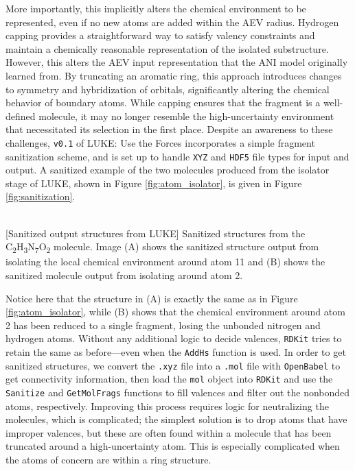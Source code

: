 More importantly, this implicitly alters the chemical environment to be represented, even if no new atoms are added within the AEV radius.
Hydrogen capping provides a straightforward way to satisfy valency constraints and maintain a chemically reasonable representation of the isolated substructure. 
However, this alters the AEV input representation that the ANI model originally learned from.
By truncating an aromatic ring, this approach introduces changes to symmetry and hybridization of orbitals, significantly altering the chemical behavior of boundary atoms.
While capping ensures that the fragment is a well-defined molecule, it may no longer resemble the high-uncertainty environment that necessitated its selection in the first place. 
Despite an awareness to these challenges, \verb|v0.1| of LUKE: Use the Forces incorporates a simple fragment sanitization scheme, and is set up to handle \verb|XYZ| and \verb|HDF5| file types for input and output. 
A sanitized example of the two molecules produced from the isolator stage of LUKE, shown in Figure \ref{fig:atom_isolator}, is given in Figure \ref{fig:sanitization}.

\begin{flushleft}
\begin{multiFigure}
\begin{centering}
    \\
[Sanitized output structures from LUKE]{
Sanitized structures from the  C\textsubscript{2}H\textsubscript{3}N\textsubscript{7}O\textsubscript{2} molecule. Image (A) shows the sanitized structure output from isolating the local chemical environment around atom 11 and (B) shows the sanitized molecule output from isolating around atom 2.
}
\label{fig:sanitization}
\end{centering}
\end{multiFigure}
\end{flushleft}

Notice here that the structure in (A) is exactly the same as in Figure \ref{fig:atom_isolator}, while (B) shows that the chemical environment around atom 2 has been reduced to a single fragment, losing the unbonded nitrogen and hydrogen atoms.
Without any additional logic to decide valences, \verb|RDKit| tries to retain the same as before---even when the \verb|AddHs| function is used.
In order to get sanitized structures, we convert the \verb|.xyz| file into a \verb|.mol| file with \verb|OpenBabel| \cite{babel} to get connectivity information, then load the \verb|mol| object into \verb|RDKit| and use the \verb|Sanitize| and \verb|GetMolFrags| functions to fill valences and filter out the nonbonded atoms, respectively.
Improving this process requires logic for neutralizing the molecules, which is complicated; the simplest solution is to drop atoms that have improper valences, but these are often found within a molecule that has been truncated around a high-uncertainty atom.
This is especially complicated when the atoms of concern are within a ring structure. 

